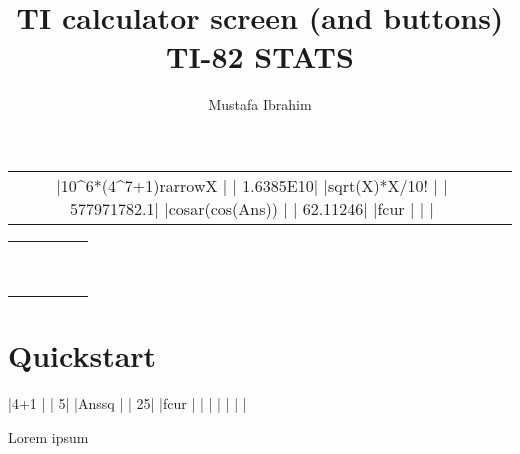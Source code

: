 \documentclass[a4paper,12pt]{article}
\title{TI calculator screen (and buttons)\\{\small TI-82 STATS}}
\author{Mustafa Ibrahim}
\begin{document}
\maketitle

\begin{center}
	\begin{tabular}{cc}
		\tiscreen
		|10^6*(4^7+1){rarrow}X  |
		|       1.6385E10|
		|{sqrt}(X)*X/10!      |
		|     577971782.1|
		|cos{ar}(cos(Ans))  |
		|        62.11246|
		|{fcur}               |
		|                |
		&
		\tibtnextramatrix
	\end{tabular}

	\dotfill

	\begin{tabular}{ccccc}
		\tibtnsecond & \tibtnmode   & \tibtndel       &                  &             \\
		\tibtnalpha  & \tibtnxton   & \tibtnstat      &                  &             \\
		\tibtnmath   & \tibtnmatrix & \tibtnprgm      & \tibtnvars       & \tibtnclear \\
		\tibtnxnone  & \tibtnsin    & \tibtncos       & \tibtntan        & \tibtnpower \\
		\tibtnxtwo   & \tibtncomma  & \tibtnleftparen & \tibtnrightparen & \tibtndiv   \\
		\tibtnlog    & \tibtnseven  & \tibtneight     & \tibtnnine       & \tibtntimes \\
		\tibtnln     & \tibtnfour   & \tibtnfive      & \tibtnsix        & \tibtnminus \\
		\tibtnsto    & \tibtnone    & \tibtntwo       & \tibtnthree      & \tibtnplus  \\
		\tibtnon     & \tibtnzero   & \tibtndot       & \tibtnneg        & \tibtnenter \\
	\end{tabular}
\end{center}

\newpage\tableofcontents\newpage

\section{Quickstart}

\begin{SideBySideExample}[xrightmargin=5.5cm]

\tiscreen
|4+1             |
|               5|
|Ans{sq}         |
|              25|
|{fcur}          |
|                |
|                |
|                |

\tibtnmatrixextra

Lorem
ipsum

\end{SideBySideExample}
\end{document}
